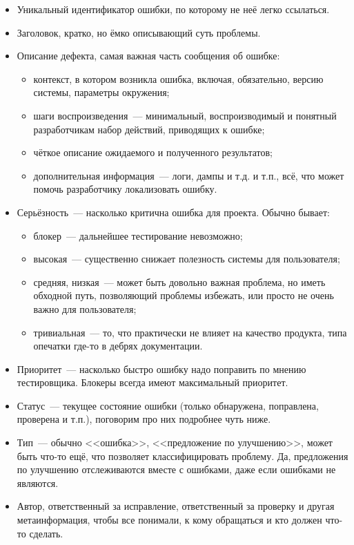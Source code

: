 \documentclass{../../text-style}
\begin{document}
\begin{itemize}
    \item Уникальный идентификатор ошибки, по которому не неё легко ссылаться.
    \item Заголовок, кратко, но ёмко описывающий суть проблемы.
    \item Описание дефекта, самая важная часть сообщения об ошибке:
    \begin{itemize}
        \item контекст, в котором возникла ошибка, включая, обязательно, версию системы, параметры окружения;
        \item шаги воспроизведения~--- минимальный, воспроизводимый и понятный разработчикам набор действий, приводящих к ошибке;
        \item чёткое описание ожидаемого и полученного результатов;
        \item дополнительная информация~--- логи, дампы и т.д. и т.п., всё, что может помочь разработчику локализовать ошибку.
    \end{itemize}
    \item Серьёзность~--- насколько критична ошибка для проекта. Обычно бывает:
    \begin{itemize}
        \item блокер~--- дальнейшее тестирование невозможно;
        \item высокая~--- существенно снижает полезность системы для пользователя;
        \item средняя, низкая~--- может быть довольно важная проблема, но иметь обходной путь, позволяющий проблемы избежать, или просто не очень важно для пользователя;
        \item тривиальная~--- то, что практически не влияет на качество продукта, типа опечатки где-то в дебрях документации.
    \end{itemize}
    \item Приоритет~--- насколько быстро ошибку надо поправить по мнению тестировщика. Блокеры всегда имеют максимальный приоритет.
    \item Статус~--- текущее состояние ошибки (только обнаружена, поправлена, проверена и т.п.), поговорим про них подробнее чуть ниже.
    \item Тип~--- обычно <<ошибка>>, <<предложение по улучшению>>, может быть что-то ещё, что позволяет классифицировать проблему. Да, предложения по улучшению отслеживаются вместе с ошибками, даже если ошибками не являются.
    \item Автор, ответственный за исправление, ответственный за проверку и другая метаинформация, чтобы все понимали, к кому обращаться и кто должен что-то сделать.
\end{itemize}
\end{document}
